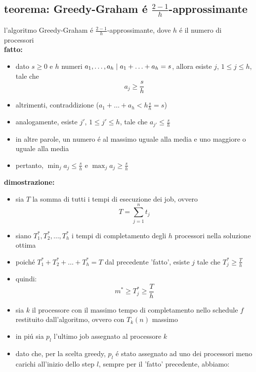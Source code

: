 \subsection*{teorema: Greedy-Graham \'e $\frac{2-1}{h}$-approssimante}
\begin{flushleft}
	l'algoritmo Greedy-Graham \'e $\frac{2-1}{h}$-approssimante, dove $h$ \'e il numero di processori \newline \\
	\vspace{0.5cm}
	\textbf{fatto:}
	\begin{itemize}
		\item dato $s\geq 0$ e $h$ numeri $a_1,\ldots,a_h\hspace{0.1cm}\vert\hspace{0.1cm}a_1+\ldots+a_h=s$, allora esiste $j$, $1\leq j\leq h$, tale che \newline
			$$a_j\geq\frac{s}{h}$$
		\item altrimenti, contraddizione ($a_1+\ldots+a_h<h\frac{s}{h}=s$)
		\item analogamente, esiste $j'$, $1\leq j'\leq h$, tale che $a_{j'}\leq\frac{s}{h}$
		\item in altre parole, un numero \'e al massimo uguale alla media e uno maggiore o uguale alla media
		\item pertanto, $\min_j a_j\leq\frac{s}{h}$ e $\max_j a_j\geq\frac{s}{h}$
	\end{itemize}
	\vspace{0.5cm}
	\textbf{dimostrazione:}
	\begin{itemize}
		\item sia $T$ la somma di tutti i tempi di esecuzione dei job, ovvero
			$$T=\sum_{j=1}^n t_j$$
		\item siano $T_1^*,T_2^*,\ldots,T_h^*$ i tempi di completamento degli $h$ processori nella soluzione ottima
		\item poich\'e $T_1^*+T_2^*+\ldots+T_h^*=T$ dal precedente 'fatto', esiste $j$ tale che $T_j^*\geq\frac{T}{h}$
		\item quindi:
			$$m^*\geq T_j^*\geq\frac{T}{h}$$
		\item sia $k$ il processore con il massimo tempo di completamento nello schedule $f$ restituito dall'algoritmo, ovvero con $T_k(n)$ massimo
		\item in pi\'u sia $p_l$ l'ultimo job assegnato al processore $k$
		\item dato che, per la scelta greedy, $p_l$ \'e stato assegnato ad uno dei processori meno carichi all'inizio dello step $l$, sempre per il 'fatto' precedente, abbiamo:

\end{itemize}
\end{flushleft}
